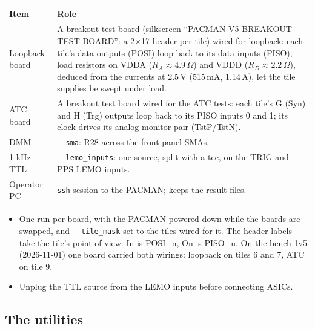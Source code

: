 \documentclass[11pt]{article}
\newcommand{\opt}[1]{\texttt{-{}-#1}}
\begin{document}
\begin{center}
\begin{tabularx}{\linewidth}{@{}lL@{}}
\toprule
Item & Role \\
\midrule
Loopback board & A breakout test board (silkscreen ``PACMAN V5 BREAKOUT TEST BOARD'':  a 2$\times$17 header per
  tile) wired for loopback:  each tile's data outputs (POSI) loop back to its data inputs (PISO);  load resistors on
  VDDA ($R_A \approx 4.9\,\Omega$) and VDDD ($R_D \approx 2.2\,\Omega$), deduced from the currents at 2.5\,V (515\,mA,
  1.14\,A), let the tile supplies be swept under load. \\
ATC board & A breakout test board wired for the ATC tests:  each tile's G (Syn) and H (Trg) outputs loop back to its
  PISO inputs 0 and 1;  its clock drives its analog monitor pair (TstP/TstN). \\
DMM & \opt{sma}: R28 across the front-panel SMAs. \\
1 kHz TTL & \opt{lemo\_inputs}: one source, split with a tee, on the TRIG and PPS LEMO inputs. \\
Operator PC & \texttt{ssh} session to the PACMAN; keeps the result files. \\
\bottomrule
\end{tabularx}
\end{center}

\begin{itemize}
\item One run per board, with the PACMAN powered down while the boards are swapped, and \opt{tile\_mask} set to the
  tiles wired for it.  The header labels take the tile's point of view:  In is POSI\_n, On is PISO\_n.  On the bench
  1v5 (2026-11-01) one board carried both wirings:  loopback on tiles 6 and 7, ATC on tile 9.
\item Unplug the TTL source from the LEMO inputs before connecting ASICs.
\end{itemize}

\subsection{The utilities}
\end{document}
